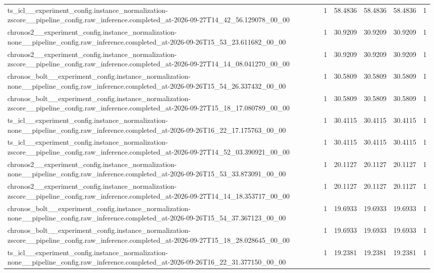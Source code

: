 \begin{tabular}{llllll}
ts\_icl\_\_experiment\_config.instance\_normalization-zscore\_\_pipeline\_config.raw\_inference.completed\_at-2026-09-27T14\_42\_56.129078\_00\_00 & 1 & 58.4836 & 58.4836 & 58.4836 & 1 \\
chronos2\_\_experiment\_config.instance\_normalization-none\_\_pipeline\_config.raw\_inference.completed\_at-2026-09-26T15\_53\_23.611682\_00\_00 & 1 & 30.9209 & 30.9209 & 30.9209 & 1 \\
chronos2\_\_experiment\_config.instance\_normalization-zscore\_\_pipeline\_config.raw\_inference.completed\_at-2026-09-27T14\_14\_08.041270\_00\_00 & 1 & 30.9209 & 30.9209 & 30.9209 & 1 \\
chronos\_bolt\_\_experiment\_config.instance\_normalization-none\_\_pipeline\_config.raw\_inference.completed\_at-2026-09-26T15\_54\_26.337432\_00\_00 & 1 & 30.5809 & 30.5809 & 30.5809 & 1 \\
chronos\_bolt\_\_experiment\_config.instance\_normalization-zscore\_\_pipeline\_config.raw\_inference.completed\_at-2026-09-27T15\_18\_17.080789\_00\_00 & 1 & 30.5809 & 30.5809 & 30.5809 & 1 \\
ts\_icl\_\_experiment\_config.instance\_normalization-none\_\_pipeline\_config.raw\_inference.completed\_at-2026-09-26T16\_22\_17.175763\_00\_00 & 1 & 30.4115 & 30.4115 & 30.4115 & 1 \\
ts\_icl\_\_experiment\_config.instance\_normalization-zscore\_\_pipeline\_config.raw\_inference.completed\_at-2026-09-27T14\_52\_03.390921\_00\_00 & 1 & 30.4115 & 30.4115 & 30.4115 & 1 \\
chronos2\_\_experiment\_config.instance\_normalization-none\_\_pipeline\_config.raw\_inference.completed\_at-2026-09-26T15\_53\_33.873091\_00\_00 & 1 & 20.1127 & 20.1127 & 20.1127 & 1 \\
chronos2\_\_experiment\_config.instance\_normalization-zscore\_\_pipeline\_config.raw\_inference.completed\_at-2026-09-27T14\_14\_18.353717\_00\_00 & 1 & 20.1127 & 20.1127 & 20.1127 & 1 \\
chronos\_bolt\_\_experiment\_config.instance\_normalization-none\_\_pipeline\_config.raw\_inference.completed\_at-2026-09-26T15\_54\_37.367123\_00\_00 & 1 & 19.6933 & 19.6933 & 19.6933 & 1 \\
chronos\_bolt\_\_experiment\_config.instance\_normalization-zscore\_\_pipeline\_config.raw\_inference.completed\_at-2026-09-27T15\_18\_28.028645\_00\_00 & 1 & 19.6933 & 19.6933 & 19.6933 & 1 \\
ts\_icl\_\_experiment\_config.instance\_normalization-none\_\_pipeline\_config.raw\_inference.completed\_at-2026-09-26T16\_22\_31.377150\_00\_00 & 1 & 19.2381 & 19.2381 & 19.2381 & 1 \\

\end{tabular}
